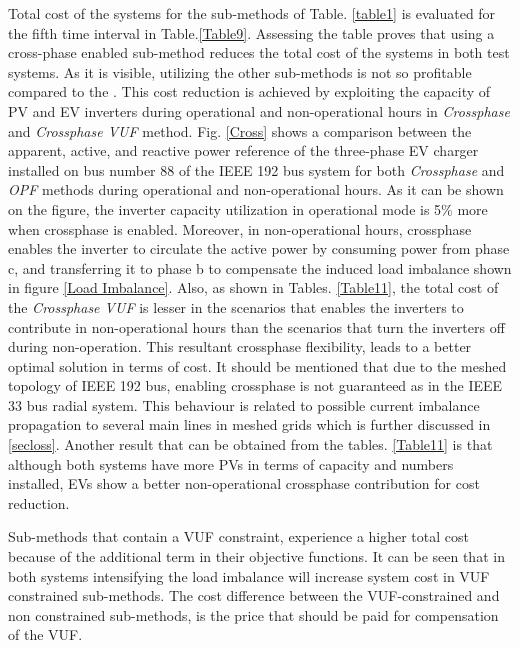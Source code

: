 \documentclass[journal]{IEEEtran}
\begin{document}
Total cost of the systems for the sub-methods of Table. \ref{table1} is evaluated for the fifth time interval in Table.\ref{Table9}. Assessing the table proves that using a cross-phase enabled sub-method reduces the total cost of the systems in both test systems. As it is visible, utilizing the other sub-methods is not so profitable compared to the . This cost reduction is achieved by exploiting the capacity of PV and EV inverters during operational and non-operational hours in \textit{Crossphase} and \textit{Crossphase VUF} method. Fig. \ref{Cross} shows a comparison between the apparent, active, and reactive power reference of the three-phase EV charger installed on bus number 88 of the IEEE 192 bus system for both \textit{Crossphase} and \textit{OPF} methods during operational and non-operational hours. As it can be shown on the figure, the inverter capacity utilization in operational mode is 5\% more when crossphase is enabled. Moreover, in non-operational hours, crossphase enables the inverter to circulate the active power by consuming power from phase c, and transferring it to phase b to compensate the induced load imbalance shown in figure \ref{Load Imbalance}. Also, as shown in Tables. \ref{Table11}, the total cost of the \textit{Crossphase VUF} is lesser in the scenarios that enables the inverters to contribute in non-operational hours than the scenarios that turn the inverters off during non-operation. This resultant crossphase flexibility, leads to a better optimal solution in terms of cost. It should be mentioned that due to the meshed topology of IEEE 192 bus, enabling crossphase is not guaranteed as in the IEEE 33 bus radial system. This behaviour is related to possible current imbalance propagation to several main lines in meshed grids which is further discussed in \ref{secloss}. Another result that can be obtained from the tables. \ref{Table11} is that although both systems have more PVs in terms of capacity and numbers installed, EVs show a better non-operational crossphase contribution for cost reduction.

Sub-methods that contain a VUF constraint, experience a higher total cost because of the additional term in their objective functions. It can be seen that in both systems intensifying the load imbalance will increase system cost in VUF constrained sub-methods. The cost difference between the VUF-constrained and non constrained sub-methods, is the price that should be paid for compensation of the VUF. 
\end{document}
